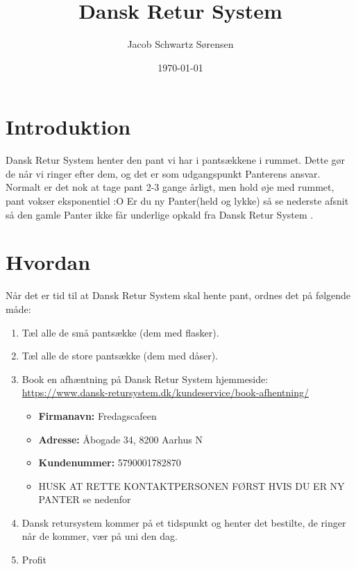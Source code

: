 

\title{Dansk Retur System}
\date{\today}
\author{Jacob Schwartz Sørensen}



\maketitle

\newcommand{\DRS}{Dansk Retur System }

\section{Introduktion}
\label{sec:Introduktion}

\DRS henter den pant vi har i pantsækkene i rummet. Dette gør de når vi ringer efter dem, og det er som udgangspunkt Panterens ansvar.
Normalt er det nok at tage pant 2-3 gange årligt, men hold øje med rummet, pant vokser eksponentiel :O
Er du ny Panter(held og lykke) så se nederste afsnit så den gamle Panter ikke får underlige opkald fra \DRS.

\section{Hvordan}
\label{sec:Hvordan}

Når det er tid til at \DRS skal hente pant, ordnes det på følgende måde:

\begin{enumerate}
	\item Tæl alle de små pantsække (dem med flasker).
	\item Tæl alle de store pantsække (dem med dåser).
	\item Book en afhæntning på \DRS hjemmeside: \url{https://www.dansk-retursystem.dk/kundeservice/book-afhentning/}
	\begin{itemize}
		\item \textbf{Firmanavn:} Fredagscafeen
		\item \textbf{Adresse:} Åbogade 34, 8200 Aarhus N
		\item \textbf{Kundenummer:} 5790001782870
		\item HUSK AT RETTE KONTAKTPERSONEN FØRST HVIS DU ER NY PANTER se nedenfor
	\end{itemize}
	\item Dansk retursystem kommer på et tidspunkt og henter det bestilte, de ringer når de kommer, vær på uni den dag.
	\item Profit
\end{enumerate}

